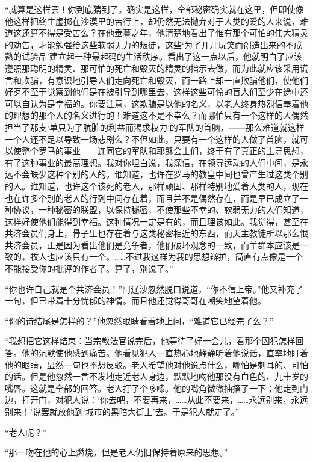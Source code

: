 \par “就算是这样罢！你到底猜到了。确实是这样，全部秘密确实就在这里，但即使像他这样把终生虚掷在沙漠里的苦行上，却仍然无法抛弃对于人类的爱的人来说，难道这还算不得是受苦么？在他垂暮之年，他清楚地看出了惟有那个可怕的伟大精灵的劝告，才能勉强给这些软弱无力的叛徒，这些‘为了开开玩笑而创造出来的不成熟的试验品’建立起一种最起码的生活秩序。看出了这一点以后，他就明白了应该遵照那聪明的精灵、那可怕的死亡和毁灭的精灵的指示去做，而为此就应该采用谎言和欺骗，有意识地引导人们走向死亡和毁灭，而一路上却一直欺骗他们，使他们好歹不至于觉察到他们是在被引导到哪里去，这样这些可怜的盲人们至少在途中还可以自认为是幸福的。你要注意，这欺骗是以他的名义，以老人终身热烈信奉着他的理想的那个人的名义进行的！难道这不是不幸么？而哪怕只有一个这样的人偶然担当了那支‘单只为了肮脏的利益而渴求权力’的军队的首脑，——那么难道就这样一个人还不足以导致一场悲剧么？不但如此，只要有一个这样的人做了首脑，就可以使整个罗马的事业——连同它的军队和耶稣会士们，终于有了真正的主导思想，有了这种事业的最高理想。我对你坦白说，我深信，在领导运动的人们中间，是永远不会缺少这种个别的人的。谁知道，也许在罗马的教皇中间也曾产生过这类个别的人。谁知道，也许这个该死的老人，那样顽固、那样特别地爱着人类的人，现在也在许多个别的老人的行列中间存在着，而且并不是偶然存在，而是早已成立了一种协议，一种秘密的联盟，以保持秘密，不使那些不幸的、软弱无力的人们知道，这样好使他们能得到幸福。这种情况一定是有的，而且理该如此。我觉得，甚至在共济会员们身上，骨子里也存在着与这类秘密相近的东西，而天主教徒所以那么恨共济会员，正是因为看出他们是竞争者，他们破坏观念的一致，而羊群本应该是一致的，牧人也应该只有一个。……不过我这样为我的思想辩护，简直有点像是一个不能接受你的批评的作者了。算了，别说了。”
\par “你也许自己就是个共济会员！”阿辽沙忽然脱口说道，“你不信上帝。”他又补充了一句，但已带着十分忧郁的神情。而且他还觉得哥哥在嘲笑地望着他。
\par “你的诗结尾是怎样的？”他忽然眼睛看着地上问，“难道它已经完了么？”
\par “我想把它这样结束：当宗教法官说完后，他等待了好一会儿，看那个囚犯怎样回答。他的沉默使他感到痛苦。他看见犯人一直热心地静静听着他说话，直率地盯着他的眼睛，显然一句也不想反驳。老人希望他对他说点什么，哪怕是刺耳的、可怕的话。但是他忽然一言不发地走近老人身边，默默地吻他那没有血色的、九十岁的嘴唇。这就是全部的回答。老人打了个哆嗦。他的嘴角微微抽搐了一下；他走到门边，打开门，对犯人说：‘你去吧，不要再来，……从此不要来，……永远别来，永远别来！’说罢就放他到‘城市的黑暗大街上’去。于是犯人就走了。”
\par “老人呢？”
\par “那一吻在他的心上燃烧，但是老人仍旧保持着原来的思想。”
